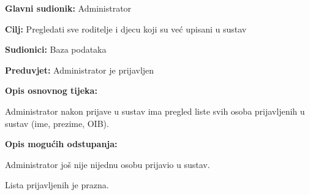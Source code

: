 						\noindent {}
					\begin{packed_item}
						
						\item \textbf{Glavni sudionik: }Administrator
						\item  \textbf{Cilj:} Pregledati sve roditelje i djecu koji su već upisani u sustav
						\item  \textbf{Sudionici:} Baza podataka
						\item  \textbf{Preduvjet:} Administrator je prijavljen
						\item  \textbf{Opis osnovnog tijeka:}
						
						\item[] \begin{packed_enum}
							
							\item Administrator nakon prijave u sustav ima pregled liste svih osoba prijavljenih u sustav (ime, prezime, OIB).
						\end{packed_enum}
						
						\item  \textbf{Opis mogućih odstupanja:}
						
						\item[] \begin{packed_item}
							
							\item[1.a] Administrator još nije nijednu osobu prijavio u sustav.
							\item[] \begin{packed_enum}
								
								\item Lista prijavljenih je prazna.
							\end{packed_enum}
							
							
						\end{packed_item}
						
						
					\end{packed_item}
					
